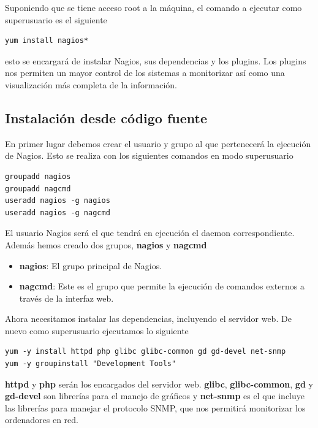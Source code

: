 \documentclass[11pt,a4paper]{article}
\begin{document}
Suponiendo que se tiene acceso root a la máquina, el comando a ejecutar como superusuario es el siguiente

\begin{verbatim}
yum install nagios*
\end{verbatim}

esto se encargará de instalar Nagios, sus dependencias y los plugins. Los plugins nos permiten un mayor control de los sistemas a monitorizar así como una visualización más completa de la información.

\subsection{Instalación desde código fuente}

En primer lugar debemos crear el usuario y grupo al que pertenecerá la ejecución de Nagios. Esto se realiza con los siguientes comandos en modo superusuario

\begin{verbatim}
groupadd nagios
groupadd nagcmd
useradd nagios -g nagios
useradd nagios -g nagcmd
\end{verbatim}

El usuario Nagios será el que tendrá en ejecución el daemon correspondiente. Además hemos creado dos grupos, \textbf{nagios} y \textbf{nagcmd}

\begin{itemize}
\item \textbf{nagios}: El grupo principal de Nagios.
\item \textbf{nagcmd}: Este es el grupo que permite la ejecución de comandos externos a través de la interfaz web.
\end{itemize}

Ahora necesitamos instalar las dependencias, incluyendo el servidor web. De nuevo como superusuario ejecutamos lo siguiente

\begin{verbatim}
yum -y install httpd php glibc glibc-common gd gd-devel net-snmp
yum -y groupinstall "Development Tools"
\end{verbatim}

\textbf{httpd} y \textbf{php} serán los encargados del servidor web. \textbf{glibc}, \textbf{glibc-common}, \textbf{gd} y \textbf{gd-devel} son librerías para el manejo de gráficos y \textbf{net-snmp} es el que incluye las librerías para manejar el protocolo SNMP, que nos permitirá monitorizar los ordenadores en red.
\\
\end{document}
